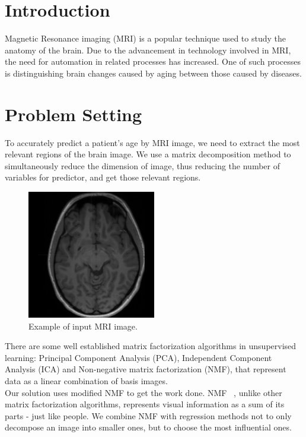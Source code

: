\documentclass[12pt]{article}
\begin{document}
\section{Introduction}

	Magnetic Resonance imaging (MRI) is a popular technique used to study the anatomy of the brain. Due to the advancement in technology involved in MRI, the need for automation in related processes has increased. One of such processes is distinguishing brain changes caused by aging between those caused by diseases.

\section{Problem Setting}

	To accurately predict a patient's age by MRI image, we need to extract the most relevant regions of the brain image. We use a matrix decomposition method to simultaneously reduce the dimension of image, thus reducing the number of variables for predictor, and get those relevant regions.
	
	\begin{figure}[h]
		\centering
		\includegraphics[width=0.5\textwidth]{mri_example.png}
		\caption{\label{fig:example}Example of input MRI image.}
	\end{figure}

	\pagebreak

	There are some well established matrix factorization algorithms in unsupervised learning: Principal Component Analysis (PCA), Independent Component Analysis (ICA) and Non-negative matrix factorization (NMF), that represent data as a linear combination of basis images.\\
	Our solution uses modified NMF to get the work done. NMF ~\cite{Lee}, unlike other matrix factorization algorithms, represents visual information as a sum of its parts - just like people. We combine NMF with regression methods not to only decompose an image into smaller ones, but to choose the most influential ones. 
\end{document}
